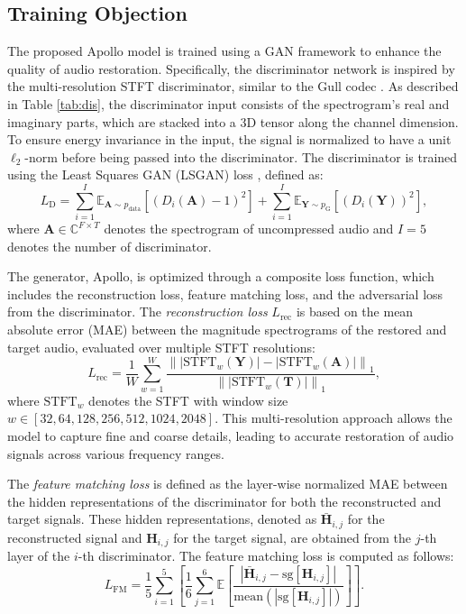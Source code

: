 \subsection{Training Objection}
The proposed Apollo model is trained using a GAN framework to enhance the quality of audio restoration. Specifically, the discriminator network is inspired by the multi-resolution STFT discriminator, similar to the Gull codec \cite{luo2024gull}. As described in Table \ref{tab:dis}, the discriminator input consists of the spectrogram's real and imaginary parts, which are stacked into a 3D tensor along the channel dimension. To ensure energy invariance in the input, the signal is normalized to have a unit $\ell_2$-norm before being passed into the discriminator. The discriminator is trained using the Least Squares GAN (LSGAN) loss \cite{mao2017least}, defined as:
\begin{equation}
    L_{\text{D}} = \sum_{i=1}^{I}\mathbb{E}_{\mathbf{A} \sim p_{\text{data}}} \left[ (D_i(\mathbf{A}) - 1)^2 \right] + \sum_{i=1}^{I}\mathbb{E}_{\mathbf{Y} \sim p_{\text{G}}} \left[ (D_i(\mathbf{Y}))^2 \right],
\end{equation}
where $\mathbf{A}\in \mathbb{C}^{F\times T}$ denotes the spectrogram of uncompressed audio and $I=5$ denotes the number of discriminator. 

The generator, Apollo, is optimized through a composite loss function, which includes the reconstruction loss, feature matching loss, and the adversarial loss from the discriminator. The \textit{reconstruction loss} $L_{\text{rec}}$ is based on the mean absolute error (MAE) between the magnitude spectrograms of the restored and target audio, evaluated over multiple STFT resolutions:
\begin{equation}
    L_{\text{rec}} =\frac{1}{W} \sum_{w=1}^{W} \frac{\left\| |\text{STFT}_{w}(\mathbf{Y})| - |\text{STFT}_{w}(\mathbf{A})| \right\|_1}{\left\| |\text{STFT}_{w}(\mathbf{T})| \right\|_1 },
\end{equation}
where $\text{STFT}_{w}$ denotes the STFT with window size $w\in [32, 64, 128, 256, 512, 1024, 2048]$. This multi-resolution approach allows the model to capture fine and coarse details, leading to accurate restoration of audio signals across various frequency ranges.

The \textit{feature matching loss} is defined as the layer-wise normalized MAE between the hidden representations of the discriminator for both the reconstructed and target signals. These hidden representations, denoted as $\bar{\mathbf{H}}_{i,j}$ for the reconstructed signal and $\mathbf{H}_{i,j}$ for the target signal, are obtained from the $j$-th layer of the $i$-th discriminator. The feature matching loss is computed as follows:
\begin{equation}
    L_{\text{FM}} = \frac{1}{5} \sum_{i=1}^{5}\left[\frac{1}{6} \sum_{j=1}^{6} \mathbb{E} \left[ \frac{\left| \bar{\mathbf{H}}_{i,j} - \text{sg}[\mathbf{H}_{i,j}] \right|}{\text{mean}\left( \left| \text{sg}[\mathbf{H}_{i,j}] \right| \right)} \right]\right].
\end{equation}

